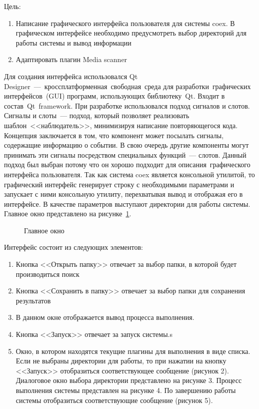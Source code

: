 Цель:
\begin{enumerate}
  \item Написание графического интерфейса пользователя для системы coex. В графическом интерфейсе необходимо предусмотреть выбор директорий для работы системы и вывод информации
  \item Адаптировать плагин Media scanner
\end{enumerate} 

Для создания интерфейса использовался Qt Designer — кроссплатформенная свободная среда для разработки графических интерфейсов (GUI) программ, использующих библиотеку Qt. Входит в состав Qt framework. При разработке использовался подход сигналов и слотов. Сигналы и слоты --- подход, который позволяет реализовать шаблон <<наблюдатель>>, минимизируя написание повторяющегося кода. Концепция заключается в том, что компонент может посылать сигналы, содержащие информацию о событии. В свою очередь другие компоненты могут принимать эти сигналы посредством специальных функций — слотов. Данный подход был выбран потому что он хорошо подходит для описания графического интерфейса пользователя.
Так как система coex является консольной утилитой, то графический интерфейс генерирует строку с необходимыми параметрами и запускает с ними консольную утилиту, перехватывая вывод и отображая его в интерфейсе. В качестве параметров выступают директории для работы системы. Главное окно представлено на рисунке~\ref{ship_1:ship_1}.

\begin{figure}[h!]
\caption{Главное окно}
\label{ship_1:ship_1}
\end{figure}

Интерфейс состоит из следующих элементов:
\begin{enumerate}
  \item Кнопка <<Открыть папку>> отвечает за выбор папки, в которой будет производиться поиск
  \item Кнопка <<Сохранить в папку>> отвечает за выбор папки для сохранения результатов
  \item В данном окне отображается вывод процесса выполнения.
  \item Кнопка <<Запуск>> отвечает за запуск системы.s
  \item Окно, в котором находятся текущие плагины для выполнения в виде списка.
Если не выбраны директории для работы, то при нажатии на кнопку <<Запуск>> отобразиться соответствующее сообщение (рисунок 2). Диалоговое окно выбора директории представлено на рисунке 3. Процесс выполнения системы представлен на рисунке 4. По завершению работы системы отобразиться соответствующие сообщение (рисунок 5).
\end{enumerate}

